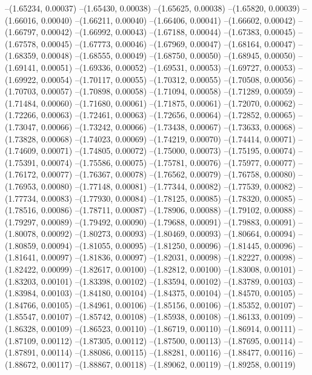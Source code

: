 --(1.65234, 0.00037)
--(1.65430, 0.00038)
--(1.65625, 0.00038)
--(1.65820, 0.00039)
--(1.66016, 0.00040)
--(1.66211, 0.00040)
--(1.66406, 0.00041)
--(1.66602, 0.00042)
--(1.66797, 0.00042)
--(1.66992, 0.00043)
--(1.67188, 0.00044)
--(1.67383, 0.00045)
--(1.67578, 0.00045)
--(1.67773, 0.00046)
--(1.67969, 0.00047)
--(1.68164, 0.00047)
--(1.68359, 0.00048)
--(1.68555, 0.00049)
--(1.68750, 0.00050)
--(1.68945, 0.00050)
--(1.69141, 0.00051)
--(1.69336, 0.00052)
--(1.69531, 0.00053)
--(1.69727, 0.00053)
--(1.69922, 0.00054)
--(1.70117, 0.00055)
--(1.70312, 0.00055)
--(1.70508, 0.00056)
--(1.70703, 0.00057)
--(1.70898, 0.00058)
--(1.71094, 0.00058)
--(1.71289, 0.00059)
--(1.71484, 0.00060)
--(1.71680, 0.00061)
--(1.71875, 0.00061)
--(1.72070, 0.00062)
--(1.72266, 0.00063)
--(1.72461, 0.00063)
--(1.72656, 0.00064)
--(1.72852, 0.00065)
--(1.73047, 0.00066)
--(1.73242, 0.00066)
--(1.73438, 0.00067)
--(1.73633, 0.00068)
--(1.73828, 0.00068)
--(1.74023, 0.00069)
--(1.74219, 0.00070)
--(1.74414, 0.00071)
--(1.74609, 0.00071)
--(1.74805, 0.00072)
--(1.75000, 0.00073)
--(1.75195, 0.00074)
--(1.75391, 0.00074)
--(1.75586, 0.00075)
--(1.75781, 0.00076)
--(1.75977, 0.00077)
--(1.76172, 0.00077)
--(1.76367, 0.00078)
--(1.76562, 0.00079)
--(1.76758, 0.00080)
--(1.76953, 0.00080)
--(1.77148, 0.00081)
--(1.77344, 0.00082)
--(1.77539, 0.00082)
--(1.77734, 0.00083)
--(1.77930, 0.00084)
--(1.78125, 0.00085)
--(1.78320, 0.00085)
--(1.78516, 0.00086)
--(1.78711, 0.00087)
--(1.78906, 0.00088)
--(1.79102, 0.00088)
--(1.79297, 0.00089)
--(1.79492, 0.00090)
--(1.79688, 0.00091)
--(1.79883, 0.00091)
--(1.80078, 0.00092)
--(1.80273, 0.00093)
--(1.80469, 0.00093)
--(1.80664, 0.00094)
--(1.80859, 0.00094)
--(1.81055, 0.00095)
--(1.81250, 0.00096)
--(1.81445, 0.00096)
--(1.81641, 0.00097)
--(1.81836, 0.00097)
--(1.82031, 0.00098)
--(1.82227, 0.00098)
--(1.82422, 0.00099)
--(1.82617, 0.00100)
--(1.82812, 0.00100)
--(1.83008, 0.00101)
--(1.83203, 0.00101)
--(1.83398, 0.00102)
--(1.83594, 0.00102)
--(1.83789, 0.00103)
--(1.83984, 0.00103)
--(1.84180, 0.00104)
--(1.84375, 0.00104)
--(1.84570, 0.00105)
--(1.84766, 0.00105)
--(1.84961, 0.00106)
--(1.85156, 0.00106)
--(1.85352, 0.00107)
--(1.85547, 0.00107)
--(1.85742, 0.00108)
--(1.85938, 0.00108)
--(1.86133, 0.00109)
--(1.86328, 0.00109)
--(1.86523, 0.00110)
--(1.86719, 0.00110)
--(1.86914, 0.00111)
--(1.87109, 0.00112)
--(1.87305, 0.00112)
--(1.87500, 0.00113)
--(1.87695, 0.00114)
--(1.87891, 0.00114)
--(1.88086, 0.00115)
--(1.88281, 0.00116)
--(1.88477, 0.00116)
--(1.88672, 0.00117)
--(1.88867, 0.00118)
--(1.89062, 0.00119)
--(1.89258, 0.00119)
